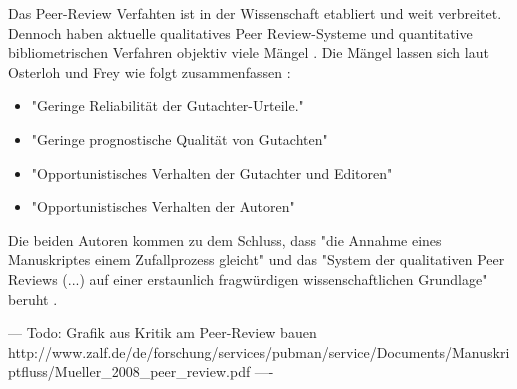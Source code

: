 Das Peer-Review Verfahten ist in der Wissenschaft etabliert und weit verbreitet. Dennoch haben aktuelle qualitatives Peer Review-Systeme und quantitative bibliometrischen Verfahren objektiv viele Mängel \cite{osterloh2008anreize} \cite{Lee_2012} \cite{Jansen_2007}. Die Mängel lassen sich laut Osterloh und Frey wie folgt zusammenfassen \cite{osterloh2008anreize}:
\begin{itemize}
\item "Geringe Reliabilität der Gutachter-Urteile."
\item "Geringe prognostische Qualität von Gutachten"
\item "Opportunistisches Verhalten der Gutachter und Editoren"
\item "Opportunistisches Verhalten der Autoren"
\end{itemize}
Die beiden Autoren kommen zu dem Schluss, dass "die Annahme eines Manuskriptes einem Zufallprozess gleicht"  und das "System der qualitativen Peer Reviews (...) auf einer erstaunlich fragwürdigen wissenschaftlichen Grundlage" beruht \cite{osterloh2008anreize}.

--- Todo: Grafik aus Kritik am Peer-Review bauen http://www.zalf.de/de/forschung/services/pubman/service/Documents/Manuskriptfluss/Mueller_2008_peer_review.pdf ----

